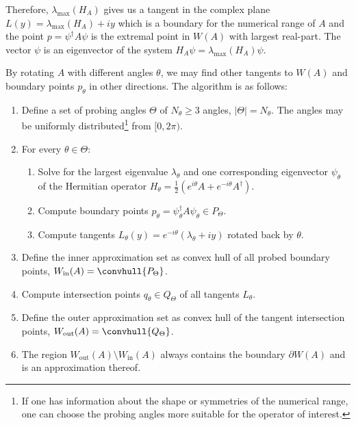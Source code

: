 Therefore, $\lambda_{\text{max}}(H_A)$ gives us a tangent in the complex plane $L(y) = \lambda_{\text{max}}(H_A) + iy$ which is a boundary for the numerical range of $A$ and the point $p = \psi^{\dagger} A \psi$ is the extremal point in $W(A)$ with largest real-part.
The vector $\psi$ is an eigenvector of the system $H_A \psi = \lambda_{\text{max}}(H_A) \psi$.

By rotating $A$ with different angles $\theta$, we may find other tangents to $W(A)$ and boundary points $p_{\theta}$ in other directions.
The algorithm is as follows:
\begin{enumerate}
\item Define a set of probing angles $\Theta$ of $N_{\theta} \geq 3$ angles, $\lvert \Theta \rvert = N_{\theta}$. The angles may be uniformly distributed\footnote{If one has information about the shape or symmetries of the numerical range, one can choose the probing angles more suitable for the operator of interest.} from $[0, 2 \pi)$.
\item{For every $\theta \in \Theta$:
	\begin{enumerate}
	\item Solve for the largest eigenvalue $\lambda_{\theta}$ and one corresponding eigenvector $\psi_{\theta}$ of the Hermitian operator $H_{\theta} = \frac{1}{2} \left(e^{i \theta} A + e^{-i \theta} A^{\dagger} \right)$.
	\item Compute boundary points $p_{\theta} = \psi_{\theta}^{\dagger} A \psi_{\theta} \in P_{\Theta}$.
	\item Compute tangents $L_{\theta}(y) = e^{-i \theta}(\lambda_{\theta} + iy)$ rotated back by $\theta$.
	\end{enumerate}
}
\item Define the inner approximation set as convex hull of all probed boundary points, $W_{\text{in}}(A) = \convhull{P_{\Theta}}$.
\item Compute intersection points $q_{\theta} \in Q_{\Theta}$ of all tangents $L_{\theta}$.
\item Define the outer approximation set as convex hull of the tangent intersection points,  $W_{\text{out}}(A) = \convhull{Q_{\Theta}}$.
\item The region $W_{\text{out}}(A) \setminus W_{\text{in}}(A)$ always contains the boundary $\partial W(A)$ and is an approximation thereof.
\end{enumerate}

